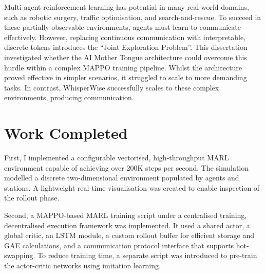 \label{sec:5}




Multi-agent reinforcement learning has potential in many real-world domains, such as robotic surgery, traffic optimisation, and search-and-rescue.
To succeed in these partially observable environments, agents must learn to communicate effectively.
However, replacing continuous communication with interpretable, discrete tokens introduces the ``Joint Exploration Problem''.
This dissertation investigated whether the AI Mother Tongue architecture could overcome this hurdle within a complex MAPPO training pipeline.
Whilst the architecture proved effective in simpler scenarios, it struggled to scale to more demanding tasks.
In contrast, WhisperWise successfully scales to these complex environments, producing communication.

\section{Work Completed}
\label{sec:5.1}

First, I implemented a configurable vectorised, high-throughput MARL environment capable of achieving over 200K steps per second.
The simulation modelled a discrete two-dimensional environment populated by agents and stations.
A lightweight real-time visualisation was created to enable inspection of the rollout phase.

Second, a MAPPO-based MARL training script under a centralised training, decentralised execution framework was implemented.
It used a shared actor, a global critic, an LSTM module, a custom rollout buffer for efficient storage and GAE calculations, and a communication protocol interface that supports hot-swapping.
To reduce training time, a separate script was introduced to pre-train the actor-critic networks using imitation learning.

